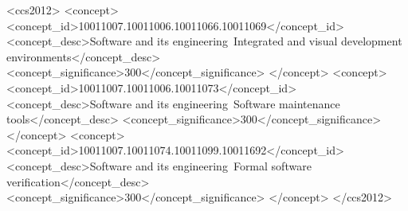 \documentclass[format=sigplan,screen,10pt]{acmart}
\begin{document}
\begin{CCSXML}
<ccs2012>
   <concept>
       <concept_id>10011007.10011006.10011066.10011069</concept_id>
       <concept_desc>Software and its engineering~Integrated and visual development environments</concept_desc>
       <concept_significance>300</concept_significance>
       </concept>
   <concept>
       <concept_id>10011007.10011006.10011073</concept_id>
       <concept_desc>Software and its engineering~Software maintenance tools</concept_desc>
       <concept_significance>300</concept_significance>
       </concept>
   <concept>
       <concept_id>10011007.10011074.10011099.10011692</concept_id>
       <concept_desc>Software and its engineering~Formal software verification</concept_desc>
       <concept_significance>300</concept_significance>
       </concept>
 </ccs2012>
\end{CCSXML}



\vspace{-0.4\baselineskip}



\maketitle

\vspace{-0.4\baselineskip}
\end{document}
